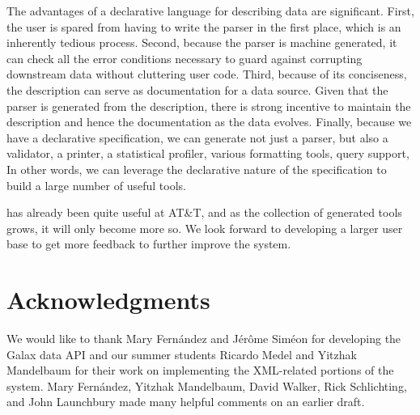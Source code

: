 \documentclass[times]{acm-sigplan}
\begin{document}
The 
advantages of a declarative language for describing data are
significant.  First, the user is spared from having to write
the parser in the first place, which is an inherently tedious
process.   Second, because the parser is machine
generated, it can check all the error conditions necessary to
guard against corrupting downstream data without cluttering
user code.  Third, because of its conciseness, the \pads{}
description can serve as documentation for a data source.  Given
that the parser is generated from the description, there is 
strong incentive to maintain the description and hence the documentation
as the data evolves.  Finally, because we have a declarative
specification, we can generate not just a parser, but also
a validator, a printer, a statistical profiler, various formatting
tools, query support, \etc{}  In other words, we can leverage the declarative nature of the specification to build a large number of useful tools.

\pads{} has already been quite useful at AT\&T, and as the collection of generated tools grows, it will only become more so.  We look forward to developing a larger user base to get more feedback to further improve the system. 


\section{Acknowledgments}
We would like to thank Mary Fern\'andez and J\'er\^ome Sim\'eon for 
developing the Galax data API and our summer
students Ricardo Medel and Yitzhak Mandelbaum for their work on implementing
the XML-related portions of the \pads{} system.
Mary Fern\'andez, Yitzhak Mandelbaum, David Walker, Rick Schlichting,
and John Launchbury made many helpful comments on an earlier draft.



\small
 
\end{document}

